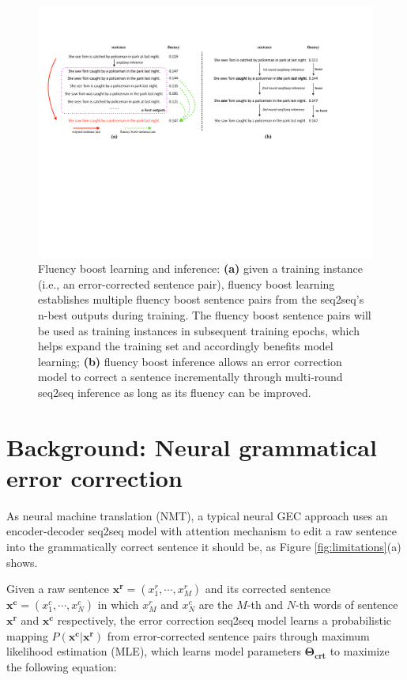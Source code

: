 \documentclass{article} %
\begin{document}
\begin{figure}[t]
\centering
\includegraphics[width=14cm]{figures/gec_motivation.pdf}\vspace{-0.5cm}
\caption{Fluency boost learning and inference: \textbf{(a)} given a training instance (i.e., an error-corrected sentence pair), fluency boost learning establishes multiple fluency boost sentence pairs from the seq2seq's n-best outputs during training. The fluency boost sentence pairs will be used as training instances in subsequent training epochs, which helps expand the training set and accordingly benefits model learning; \textbf{(b)} fluency boost inference allows an error correction model to correct a sentence incrementally through multi-round seq2seq inference as long as its fluency can be improved.}\label{fig:fb}
\end{figure}

\section{Background: Neural grammatical error correction}\label{sec:background}

As neural machine translation (NMT), a typical neural GEC approach uses an encoder-decoder seq2seq model \citep{DBLP:journals/corr/SutskeverVL14,cho-EtAl:2014:EMNLP2014} with attention mechanism \citep{DBLP:journals/corr/BahdanauCB14} to edit a raw sentence into the grammatically correct sentence it should be, as Figure \ref{fig:limitations}(a) shows.

Given a raw sentence $\boldsymbol{x^r}=(x^r_1,\cdots,x^r_M)$ and its corrected sentence $\boldsymbol{x^c}=(x^c_1,\cdots,x^c_N)$ in which $x^r_M$ and $x^c_N$ are the $M$-th and $N$-th words of sentence $\boldsymbol{x^r}$ and $\boldsymbol{x^c}$ respectively, the error correction seq2seq model learns a probabilistic mapping $P(\boldsymbol{x^c}|\boldsymbol{x^r})$ from error-corrected sentence pairs through maximum likelihood estimation (MLE), which learns model parameters $\boldsymbol{\Theta_{crt}}$ to maximize the following equation: 
\end{document}
